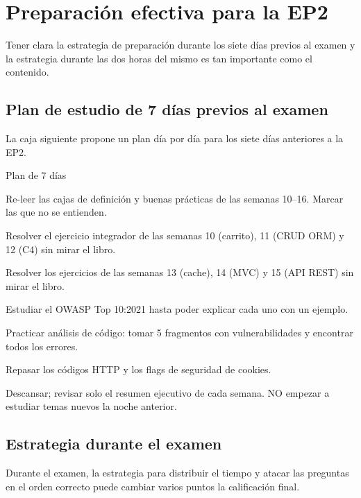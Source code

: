 \section{Preparación efectiva para la EP2}

Tener clara la estrategia de preparación durante los siete
días previos al examen y la estrategia durante las dos horas del
mismo es tan importante como el contenido.


\subsection{Plan de estudio de 7 días previos al examen}

La caja siguiente propone un plan día por día para los
siete días anteriores a la EP2.


\begin{cajabuenas}{Plan de 7 días}
\begin{description}[leftmargin=1.5cm]
\item[Día -7:] Re-leer las cajas de definición y buenas prácticas
de las semanas 10--16. Marcar las que no se entienden.
\item[Día -6:] Resolver el ejercicio integrador de las semanas 10
(carrito), 11 (CRUD ORM) y 12 (C4) sin mirar el libro.
\item[Día -5:] Resolver los ejercicios de las semanas 13 (cache),
14 (MVC) y 15 (API REST) sin mirar el libro.
\item[Día -4:] Estudiar el OWASP Top 10:2021 hasta poder explicar
cada uno con un ejemplo.
\item[Día -3:] Practicar análisis de código: tomar 5 fragmentos
con vulnerabilidades y encontrar todos los errores.
\item[Día -2:] Repasar los códigos HTTP y los flags de seguridad de
cookies.
\item[Día -1:] Descansar; revisar solo el resumen ejecutivo de cada
semana. NO empezar a estudiar temas nuevos la noche anterior.
\end{description}
\end{cajabuenas}

\subsection{Estrategia durante el examen}

Durante el examen, la estrategia para distribuir el tiempo
y atacar las preguntas en el orden correcto puede cambiar varios
puntos la calificación final.


